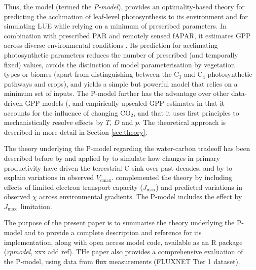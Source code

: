 \documentclass[gmd, manuscript]{copernicus}
\newcommand{\vcmax}{$V_{\text{cmax}}$}
\newcommand{\jmax}{$J_{\text{max}}$}
\begin{document}
Thus, the model (termed the \textit{P-model}), provides an optimality-based theory for predicting the acclimation of leaf-level photosynthesis to its environment and for simulating LUE while relying on a minimum of prescribed parameters. In combination with prescribed PAR and remotely sensed fAPAR, it estimates GPP across diverse environmental conditions \citep{wang17natpl}. Its prediction for acclimating photosynthetic parameters reduces the number of prescribed (and temporally fixed) values, avoids the distinction of model parameterisation by vegetation types or biomes (apart from distinguishing between the C$_3$ and C$_4$ photosynthetic pathways and crops), and yields a simple but powerful model that relies on a minimum set of inputs. The P-model further has the advantage over other data-driven GPP models (\citep{running04, Zhang2017-yr}, and empirically upscaled GPP estimates \citep{jung11jgr} in that it accounts for the influence of changing CO$_2$, and that it uses first principles to mechanistically resolve effects by $T$, $D$ and $p$. The theoretical approach is described in more detail in Section \ref{sec:theory}.

The theory underlying the P-model regarding the water-carbon tradeoff has been described before by \citet{prentice14ecollett} and applied by \citet{keenan17natcomm} to simulate how changes in primary productivity have driven the terrestrial C sink over past decades, and by \citet{smith19ecollett} to explain variations in observed \vcmax .  \citet{wang17natpl} complemented the theory by including effects of limited electron transport capacity (\jmax ) and predicted variations in observed $\chi$ across environmental gradients. The P-model includes the effect by \jmax\ limitation.

The purpose of the present paper is to summarise the theory underlying the P-model and to provide a complete description and reference for its implementation, along with open access model code, available as an R package (\textit{rpmodel}, xxx add ref). THe paper also provides a comprehensive evaluation of the P-model, using data from flux measurements (FLUXNET Tier 1 dataset). %
\end{document}

